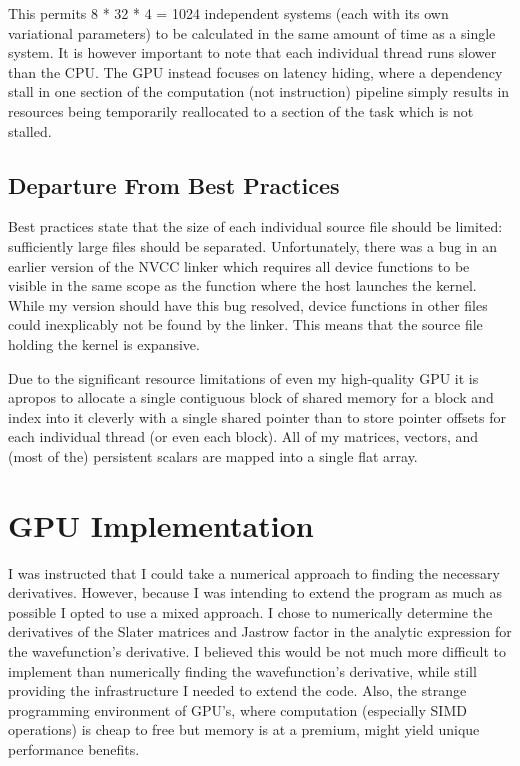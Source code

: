 \documentclass[11pt, conference, compsocconf]{IEEEtran}
\begin{document}
This permits 8 * 32 * 4 = 1024 independent systems (each with its own variational parameters) to be calculated in the same amount of time as a single system. It is however important to note that each individual thread runs slower than the CPU. The GPU instead focuses on latency hiding, where a dependency stall in one section of the computation (not instruction) pipeline simply results in resources being temporarily reallocated to a section of the task which is not stalled.   

\subsection{Departure From Best Practices}
Best practices state that the size of each individual source file should be limited: sufficiently large files should be separated. Unfortunately, there was a bug in an earlier version of the NVCC linker which requires all device functions to be visible in the same scope as the function where the host launches the kernel. While my version should have this bug resolved, device functions in other files could inexplicably not be found by the linker. This means that the source file holding the kernel is expansive.

Due to the significant resource limitations of even my high-quality GPU it is apropos to allocate a single contiguous block of shared memory for a block and index into it cleverly with a single shared pointer than to store pointer offsets for each individual thread (or even each block). All of my matrices, vectors, and (most of the) persistent scalars are mapped into a single flat array.

\section{GPU Implementation}
I was instructed that I could take a numerical approach to finding the necessary derivatives. However, because I was intending to extend the program as much as possible I opted to use a mixed approach. I chose to numerically determine the derivatives of the Slater matrices and Jastrow factor in the analytic expression for the wavefunction's derivative. I believed this would be not much more difficult to implement than numerically finding the wavefunction's derivative, while still providing the infrastructure I needed to extend the code. Also, the strange programming environment of GPU's, where computation (especially SIMD operations) is cheap to free but memory is at a premium, might yield unique performance benefits.
\end{document}
